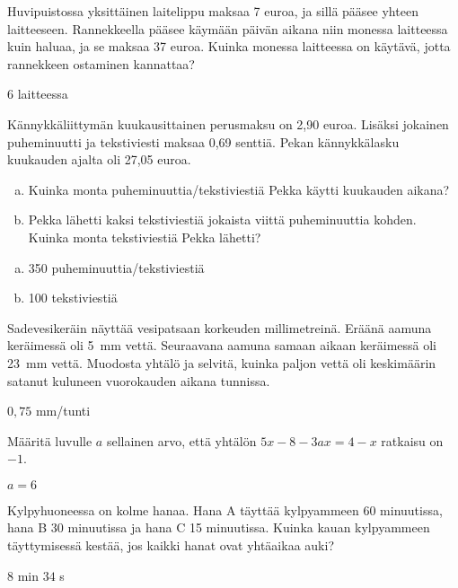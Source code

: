 \begin{tehtava}
Huvipuistossa yksittäinen laitelippu maksaa 7 euroa, ja sillä pääsee yhteen laitteeseen. Rannekkeella pääsee käymään päivän aikana niin monessa laitteessa kuin haluaa, ja se maksaa 37 euroa. Kuinka monessa laitteessa on käytävä, jotta rannekkeen ostaminen kannattaa?
\begin{vastaus}
$6$ laitteessa
\end{vastaus}
\end{tehtava}

\begin{tehtava}
Kännykkäliittymän kuukausittainen perusmaksu on 2,90 euroa. Lisäksi jokainen puheminuutti ja tekstiviesti maksaa 0,69 senttiä. Pekan kännykkälasku kuukauden
ajalta oli 27,05 euroa.

\begin{enumerate}[a)]
	\item Kuinka monta puheminuuttia/tekstiviestiä Pekka käytti kuukauden aikana?
	\item Pekka lähetti kaksi tekstiviestiä jokaista viittä puheminuuttia kohden. Kuinka monta tekstiviestiä Pekka lähetti?
\end{enumerate}

	\begin{vastaus}
		\begin{enumerate}[a)]
			\item 350 puheminuuttia/tekstiviestiä
			\item 100 tekstiviestiä
		\end{enumerate}
	\end{vastaus}
\end{tehtava}

\begin{tehtava}
Sadevesikeräin näyttää vesipatsaan korkeuden millimetreinä. Eräänä aamuna
keräimessä oli 5~mm vettä. Seuraavana aamuna samaan aikaan keräimessä oli 23~mm vettä. Muodosta yhtälö ja selvitä, kuinka paljon vettä oli keskimäärin satanut kuluneen vuorokauden aikana tunnissa.
	\begin{vastaus}
	$0,75$ mm/tunti
	\end{vastaus}
\end{tehtava}

\begin{tehtava}
Määritä luvulle $a$ sellainen arvo, että yhtälön $5x-8-3ax=4-x$ ratkaisu on $-1$.
\begin{vastaus}
$a=6$
\end{vastaus}
\end{tehtava}

\begin{tehtava}
Kylpyhuoneessa on kolme hanaa. Hana A täyttää kylpyammeen 60 minuutissa, hana B 30 minuutissa ja hana C 15 minuutissa. Kuinka kauan kylpyammeen täyttymisessä kestää, jos kaikki hanat ovat yhtäaikaa auki?
\begin{vastaus}
$8$ min $34$ s
\end{vastaus}
\end{tehtava}
